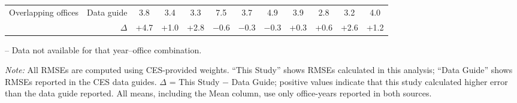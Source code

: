 \begin{table}[p]
{\begin{threeparttable}
\begin{tabular}{lrcccccccccc}
Overlapping offices & Data guide & 3.8 & 3.4 & 3.3 & 7.5 & 3.7 & 4.9 & 3.9 & 2.8 & 3.2 & 4.0 \\
 & $\Delta$ & +4.7 & +1.0 & +2.8 & $-$0.6 & $-$0.3 & $-$0.3 & +0.3 & +0.6 & +2.6 & +1.2 \\
\bottomrule
\end{tabular}
\begin{tablenotes}
\footnotesize
\item -- Data not available for that year--office combination.
\item \textit{Note:} All RMSEs are computed using CES-provided weights. ``This Study'' shows RMSEs calculated in this analysis; ``Data Guide'' shows RMSEs reported in the CES data guides. $\Delta$ = This Study $-$ Data Guide; positive values indicate that this study calculated higher error than the data guide reported. All means, including the Mean column, use only office-years reported in both sources.
\end{tablenotes}
\end{threeparttable}%
}
\end{table}